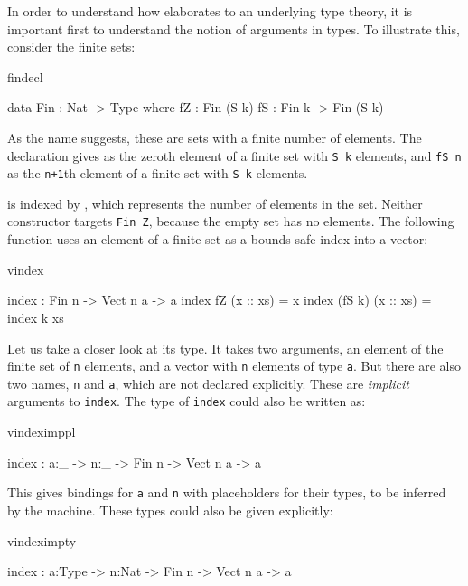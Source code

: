 In order to understand how \Idris{} elaborates to an underlying type theory,
it is important first to understand the notion of  arguments
in types.
To illustrate this, consider the finite sets:

\begin{SaveVerbatim}{findecl}

data Fin : Nat -> Type where
      fZ : Fin (S k)
      fS : Fin k -> Fin (S k)

\end{SaveVerbatim}

\noindent
As the name suggests, these are sets with a finite number of elements.
The declaration gives
 as the zeroth element of a finite set with \texttt{S k} elements,
and \texttt{fS n} as the
\texttt{n+1}th element of a finite set with \texttt{S k} elements. 

 is indexed by , which represents the number of elements in
the set.  Neither constructor targets \texttt{Fin Z}, because the empty
set has no elements. The following function uses an element
of a finite set as a bounds-safe index into a vector:

\begin{SaveVerbatim}{vindex}

index : Fin n -> Vect n a -> a
index fZ     (x :: xs) = x
index (fS k) (x :: xs) = index k xs

\end{SaveVerbatim}

\noindent
Let us take a closer look at its type.
It takes two arguments, an element of the finite set of \texttt{n} elements, and a vector
with \texttt{n} elements of type \texttt{a}. But there are also two names, 
\texttt{n} and \texttt{a}, which are not declared explicitly. These are \emph{implicit}
arguments to \texttt{index}. The type of \texttt{index} could also be written as:

\begin{SaveVerbatim}{vindeximppl}

index : {a:_} -> {n:_} -> Fin n -> Vect n a -> a

\end{SaveVerbatim}

\noindent
This gives bindings for \texttt{a} and \texttt{n} with placeholders for
their types, to be inferred by the machine. These types could also be given explicitly:

\begin{SaveVerbatim}{vindeximpty}

index : {a:Type} -> {n:Nat} -> Fin n -> Vect n a -> a

\end{SaveVerbatim}

